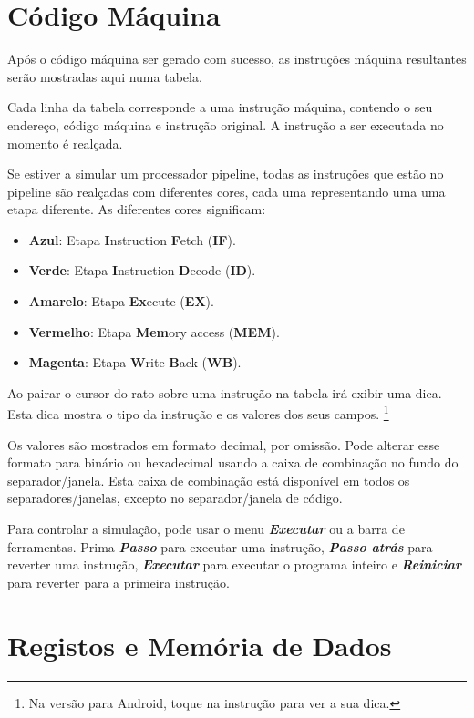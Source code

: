 \documentclass[11pt,a4paper,twoside,titlepage]{report}
\newcommand{\menupath}[1]{\textbf{\emph{#1}}}
\begin{document}
\section{Código Máquina} \label{sec:assembled}

Após o código máquina ser gerado com sucesso, as instruções máquina
resultantes serão mostradas aqui numa tabela.

Cada linha da tabela corresponde a uma instrução máquina, contendo o seu
endereço, código máquina e instrução original.
A instrução a ser executada no momento é realçada.

Se estiver a simular um processador pipeline, todas as instruções que estão no
pipeline são realçadas com diferentes cores, cada uma representando uma uma etapa
diferente.
As diferentes cores significam:
\begin{itemize}
	\item \textbf{Azul}: Etapa \textbf{I}nstruction \textbf{F}etch (\textbf{IF}).
	\item \textbf{Verde}: Etapa \textbf{I}nstruction \textbf{D}ecode (\textbf{ID}).
	\item \textbf{Amarelo}: Etapa \textbf{Ex}ecute (\textbf{EX}).
	\item \textbf{Vermelho}: Etapa \textbf{Mem}ory access (\textbf{MEM}).
	\item \textbf{Magenta}: Etapa \textbf{W}rite \textbf{B}ack (\textbf{WB}).
\end{itemize}

Ao pairar o cursor do rato sobre uma instrução na tabela irá exibir uma dica.
Esta dica mostra o tipo da instrução e os valores dos seus campos. \footnote{Na
versão para Android, toque na instrução para ver a sua dica.}

Os valores são mostrados em formato decimal, por omissão.
Pode alterar esse formato para binário ou hexadecimal usando a caixa de 
combinação no fundo do separador/janela.
Esta caixa de combinação está disponível em todos os separadores/janelas, 
excepto no separador/janela de código.

Para controlar a simulação, pode usar o menu \menupath{Executar} ou a barra de
ferramentas. Prima \menupath{Passo} para executar uma instrução, 
\menupath{Passo atrás} para reverter uma instrução, \menupath{Executar} para
executar o programa inteiro e \menupath{Reiniciar} para reverter para a primeira
instrução.


\section{Registos e Memória de Dados}
\end{document}
